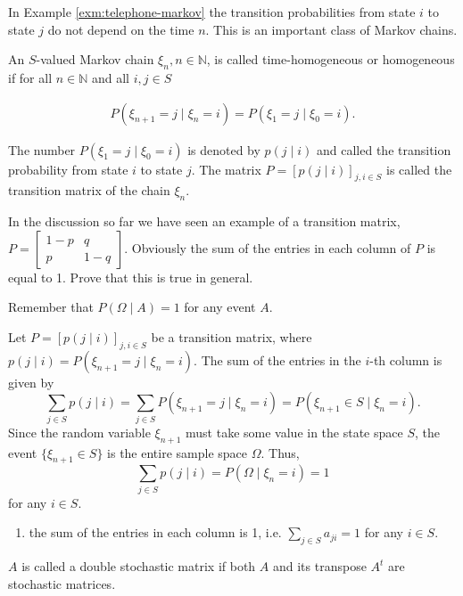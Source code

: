 In Example \ref{exm:telephone-markov} the transition probabilities from state $i$ to state $j$ do not depend on the time $n$. This is an important class of Markov chains.

\begin{Definition}
\label{def:time-homogeneous}
An $S$-valued Markov chain $\xi_n, n\in\mathbb{N}$, is called time-homogeneous or homogeneous if for all $n\in\mathbb{N}$ and all $i, j\in S$

\begin{align}
P(\xi_{n+1} = j \mid \xi_n = i) = P(\xi_1 = j \mid \xi_0 = i). \tag{5.16}
\end{align}

The number $P(\xi_1 = j \mid \xi_0 = i)$ is denoted by $p(j \mid i)$ and called the transition probability from state $i$ to state $j$. The matrix $P = [p(j \mid i)]_{j,i\in S}$ is called the transition matrix of the chain $\xi_n$.
\end{Definition}

\begin{Exercise}
\label{exr:transition-matrix-columns}
In the discussion so far we have seen an example of a transition matrix, $P = \begin{bmatrix} 1-p & q \\ p & 1-q \end{bmatrix}$. Obviously the sum of the entries in each column of $P$ is equal to 1. Prove that this is true in general.

\begin{hint}
Remember that $P(\Omega \mid A) = 1$ for any event $A$.
\end{hint}
\end{Exercise}

\begin{Solution}
Let $P = [p(j \mid i)]_{j,i \in S}$ be a transition matrix, where $p(j \mid i) = P(\xi_{n+1} = j \mid \xi_n = i)$. The sum of the entries in the $i$-th column is given by
\[
\sum_{j \in S} p(j \mid i) = \sum_{j \in S} P(\xi_{n+1} = j \mid \xi_n = i) = P(\xi_{n+1} \in S \mid \xi_n = i).
\]
Since the random variable $\xi_{n+1}$ must take some value in the state space $S$, the event $\{\xi_{n+1} \in S\}$ is the entire sample space $\Omega$. Thus,
\[
\sum_{j \in S} p(j \mid i) = P(\Omega \mid \xi_n = i) = 1
\]
for any $i \in S$.
\end{Solution}

\begin{Definition}
\begin{enumerate}
\item the sum of the entries in each column is 1, i.e. $\sum_{j\in S} a_{ji} = 1$ for any $i\in S$.
\end{enumerate}

$A$ is called a double stochastic matrix if both $A$ and its transpose $A^t$ are stochastic matrices.
\end{Definition}

